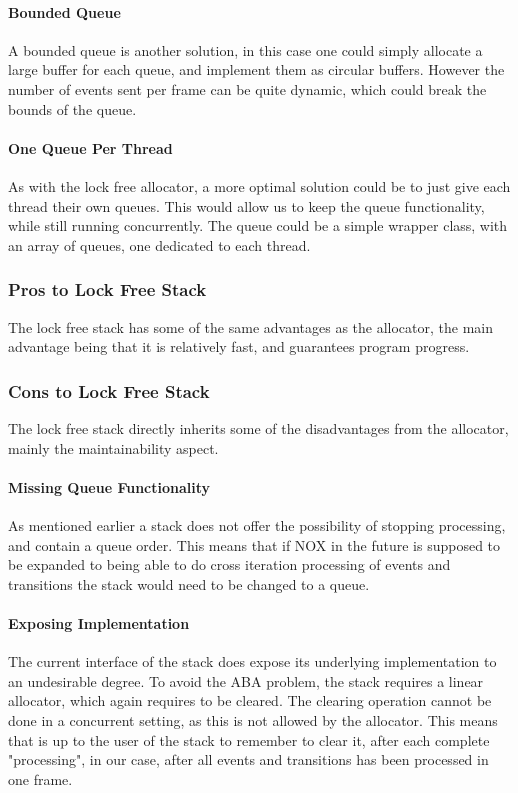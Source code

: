 \paragraph{Bounded Queue}
A bounded queue is another solution, in this case one could simply allocate a large
buffer for each queue, and implement them as circular buffers.
However the number of events sent per frame can be quite dynamic, which could break the
bounds of the queue.

\paragraph{One Queue Per Thread}
As with the lock free allocator, a more optimal solution could be to just give each thread
their own queues. This would allow us to keep the queue functionality, while still running
concurrently. The queue could be a simple wrapper class, with an array of queues, one dedicated
to each thread.

\subsubsection{Pros to Lock Free Stack}
The lock free stack has some of the same advantages as the allocator,
the main advantage being that it is relatively fast, and guarantees program progress.

\subsubsection{Cons to Lock Free Stack}
The lock free stack directly inherits some of the disadvantages from the allocator,
mainly the maintainability aspect.

\paragraph{Missing Queue Functionality}
As mentioned earlier a stack does not offer the possibility of stopping processing,
and contain a queue order.
This means that if NOX in the future is supposed to be expanded to being able to
do cross iteration processing of events and transitions the stack would need to be changed
to a queue.

\paragraph{Exposing Implementation}
The current interface of the stack does expose its underlying implementation to an
undesirable degree.
To avoid the ABA problem, the stack requires a linear allocator, which again requires
to be cleared.
The clearing operation cannot be done in a concurrent setting, as this is not allowed by the allocator.
This means that is up to the user of the stack to remember to clear it,
after each complete "processing", in our case, after all events and transitions has been processed
in one frame.
